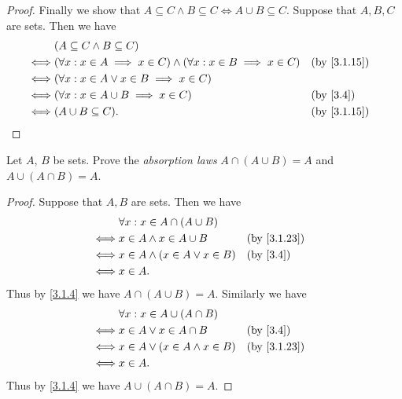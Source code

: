 \begin{proof}
  Finally we show that \(A \subseteq C \land B \subseteq C \iff A \cup B \subseteq C\).
  Suppose that \(A, B, C\) are sets.
  Then we have
  \begin{align*}
         & (A \subseteq C \land B \subseteq C)                                                                                \\
    \iff & (\forall x : x \in A \implies x \in C) \land (\forall x : x \in B \implies x \in C) &  & \text{(by \cref{3.1.15})} \\
    \iff & (\forall x : x \in A \lor x \in B \implies x \in C)                                                                \\
    \iff & (\forall x : x \in A \cup B \implies x \in C)                                       &  & \text{(by \cref{3.4})}    \\
    \iff & (A \cup B \subseteq C).                                                             &  & \text{(by \cref{3.1.15})}
  \end{align*}
\end{proof}

\begin{ex}\label{ex:3.1.8}
  Let \(A\), \(B\) be sets.
  Prove the \emph{absorption laws} \(A \cap (A \cup B) = A\) and \(A \cup (A \cap B) = A\).
\end{ex}

\begin{proof}
  Suppose that \(A, B\) are sets.
  Then we have
  \begin{align*}
         & \forall x : x \in A \cap (A \cup B)                                 \\
    \iff & x \in A \land x \in A \cup B         &  & \text{(by \cref{3.1.23})} \\
    \iff & x \in A \land (x \in A \lor x \in B) &  & \text{(by \cref{3.4})}    \\
    \iff & x \in A.
  \end{align*}
  Thus by \cref{3.1.4} we have \(A \cap (A \cup B) = A\).
  Similarly we have
  \begin{align*}
         & \forall x : x \in A \cup (A \cap B)                                 \\
    \iff & x \in A \lor x \in A \cap B          &  & \text{(by \cref{3.4})}    \\
    \iff & x \in A \lor (x \in A \land x \in B) &  & \text{(by \cref{3.1.23})} \\
    \iff & x \in A.
  \end{align*}
  Thus by \cref{3.1.4} we have \(A \cup (A \cap B) = A\).
\end{proof}

